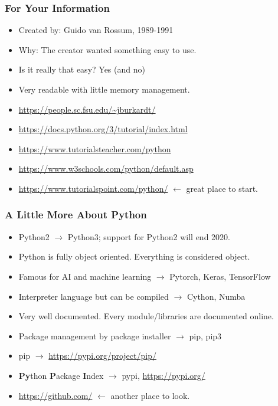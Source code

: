 
\begin{frame}
\frametitle{For Your Information}

\begin{itemize}
\item Created by: Guido van Rossum, 1989-1991
\item Why: The creator wanted something easy to use.
\item Is it really that easy? Yes (and no)
\item Very readable with little memory management.
\item \url{https://people.sc.fsu.edu/~jburkardt/}
\item \url{https://docs.python.org/3/tutorial/index.html}
\item \url{https://www.tutorialsteacher.com/python}
\item \url{https://www.w3schools.com/python/default.asp}
\item \url{https://www.tutorialspoint.com/python/} $\longleftarrow$ great place to start.
\end{itemize}

\end{frame}

\begin{frame}
\frametitle{A Little More About Python}

\begin{itemize}
\item Python2 $\longrightarrow$ Python3; support for Python2 will end 2020.
\item Python is fully object oriented. Everything is considered object.
\item Famous for AI and machine learning $\longrightarrow$ Pytorch, Keras, TensorFlow
\item Interpreter language but can be compiled $\longrightarrow$ Cython, Numba
\item Very well documented. Every module/libraries are documented online.
\item Package management by package installer $\longrightarrow$ pip, pip3
\item pip $\longrightarrow$ \url{https://pypi.org/project/pip/}
\item \textbf{Py}thon \textbf{P}ackage \textbf{I}ndex $\longrightarrow$ pypi, \url{https://pypi.org/}
\item \url{https://github.com/} $\longleftarrow$ another place to look.
\end{itemize}

\end{frame}

